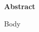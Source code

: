 
\begin{center}
    
\vspace*{0.3in}

\Large{\textbf{Abstract}}

\vspace{5mm}
\end{center}

\begin{doublespace}
     Body

\end{doublespace}
